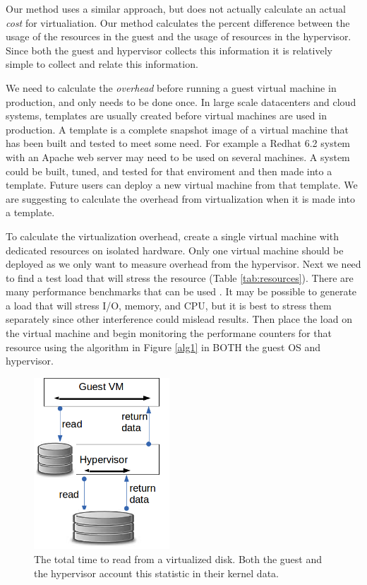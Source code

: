 \indent Our method uses a similar approach, but does not actually calculate an actual \emph{cost} for virtualiation.  Our method calculates the percent difference between the usage of the resources in the guest and the usage of resources in the hypervisor.  Since both the guest and hypervisor collects this information it is relatively simple to collect and relate this information.  

\indent We need to calculate the \emph{overhead} before running a guest virtual machine in production, and only needs to be done once.  In large scale datacenters and cloud systems, templates are usually created before virtual machines are used in production.  A template is a complete snapshot image of a virtual machine that has been built and tested to meet some need.  For example a Redhat 6.2 system with an Apache web server may need to be used on several machines.  A system could be built, tuned, and tested for that enviroment and then made into a template.  Future users can deploy a new virtual machine from that template.  We are suggesting to calculate the overhead from virtualization when it is made into a template.  

\indent To calculate the virtualization overhead, create a single virtual machine with dedicated resources on isolated hardware.  
Only one virtual machine should be deployed as we only want to measure overhead from the hypervisor. Next we need to find a test load that will stress the resource (Table \ref{tab:resources}).   
There are many performance benchmarks that can be used \cite{katcher, tikotekar, hplBench}. 
It may be possible to generate a load that will stress I/O, memory, and CPU, but it is best to stress them separately since other interference could mislead results.  
Then place the load on the virtual machine and begin monitoring the performane counters for that resource using the algorithm in Figure \ref{alg1} in BOTH the guest OS and hypervisor. 

\begin{figure}[!h]
  \begin{center}
  \includegraphics[width=2in]{images/ReadOperation.png}
  \caption{The total time to read from a virtualized disk.  Both the guest and the hypervisor account this statistic in their kernel data.}
  \label{readOp}
  \end{center}
\end{figure}


